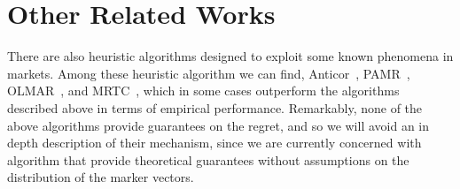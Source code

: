 \section{Other Related Works}

There are also heuristic algorithms designed to exploit some known phenomena in markets. Among these heuristic algorithm we can find, Anticor~\cite{borodin2004can}, PAMR~\cite{li2012pamr}, OLMAR~\cite{li2015moving}, and MRTC~\cite{yang2018reversion}, which in some cases outperform the algorithms described above in terms of empirical performance. 
Remarkably, none of the above algorithms provide guarantees on the regret, and so we will avoid an in depth description of their mechanism, since we are currently concerned with algorithm that provide theoretical guarantees without assumptions on the distribution of the marker vectors.

